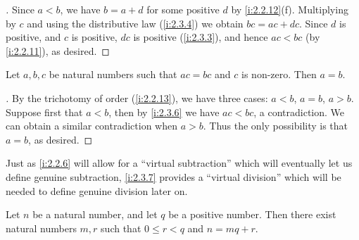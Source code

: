 \begin{proof}[]
  Since \(a < b\), we have \(b = a + d\) for some positive \(d\) by \cref{i:2.2.12}(f).
  Multiplying by \(c\) and using the distributive law (\cref{i:2.3.4}) we obtain \(bc = ac + dc\).
  Since \(d\) is positive, and \(c\) is positive, \(dc\) is positive (\cref{i:2.3.3}), and hence \(ac < bc\) (by \cref{i:2.2.11}), as desired.
\end{proof}

\begin{cor}\label{i:2.3.7}
  Let \(a, b, c\) be natural numbers such that \(ac = bc\) and \(c\) is non-zero.
  Then \(a = b\).
\end{cor}

\begin{proof}[]
  By the trichotomy of order (\cref{i:2.2.13}), we have three cases: \(a < b\), \(a = b\), \(a > b\).
  Suppose first that \(a < b\), then by \cref{i:2.3.6} we have \(ac < bc\), a contradiction.
  We can obtain a similar contradiction when \(a > b\).
  Thus the only possibility is that \(a = b\), as desired.
\end{proof}

\begin{rmk}\label{i:2.3.8}
  Just as \cref{i:2.2.6} will allow for a ``virtual subtraction'' which will eventually let us define genuine subtraction, \cref{i:2.3.7} provides a ``virtual division'' which will be needed to define genuine division later on.
\end{rmk}

\begin{prop}\label{i:2.3.9}
  Let \(n\) be a natural number, and let \(q\) be a positive number.
  Then there exist natural numbers \(m, r\) such that \(0 \leq r < q\) and \(n = mq + r\).
\end{prop}

